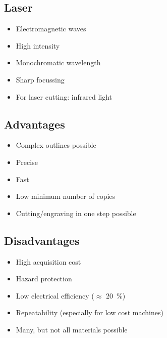 \documentclass[aspectratio=169]{beamer}
\begin{document}
\subsection{Laser}

\begin{frame}
    \begin{itemize}
        \item Electromagnetic waves
        \item High intensity
        \item Monochromatic wavelength
        \item Sharp focussing
        \item For laser cutting: infrared light
    \end{itemize}
\end{frame}

\subsection{Advantages}

\begin{frame}
    \begin{itemize}
        \item Complex outlines possible
        \item Precise
        \item Fast
        \item Low minimum number of copies
        \item Cutting/engraving in one step possible
    \end{itemize}
\end{frame}

\subsection{Disadvantages}

\begin{frame}
    \begin{itemize}
        \item High acquisition cost
        \item Hazard protection
        \item Low electrical efficiency ($\approx$ \SI{20}{\percent})
        \item Repeatability (especially for low cost machines)
        \item Many, but not all materials possible
    \end{itemize}
\end{frame}
\end{document}
